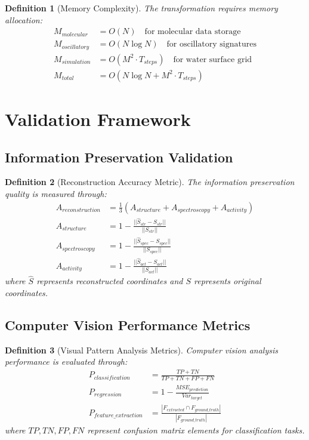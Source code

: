 \documentclass[12pt,a4paper]{article}
\newtheorem{definition}{Definition}
\begin{document}
\begin{definition}[Memory Complexity]
The transformation requires memory allocation:
\begin{align}
M_{molecular} &= O(N) \quad \text{for molecular data storage} \\
M_{oscillatory} &= O(N \log N) \quad \text{for oscillatory signatures} \\
M_{simulation} &= O(M^2 \cdot T_{steps}) \quad \text{for water surface grid} \\
M_{total} &= O(N \log N + M^2 \cdot T_{steps})
\end{align}
\end{definition}

\section{Validation Framework}

\subsection{Information Preservation Validation}

\begin{definition}[Reconstruction Accuracy Metric]
The information preservation quality is measured through:
\begin{align}
A_{reconstruction} &= \frac{1}{3} \left( A_{structure} + A_{spectroscopy} + A_{activity} \right) \\
A_{structure} &= 1 - \frac{||\hat{S}_{str} - S_{str}||}{||S_{str}||} \\
A_{spectroscopy} &= 1 - \frac{||\hat{S}_{spec} - S_{spec}||}{||S_{spec}||} \\
A_{activity} &= 1 - \frac{||\hat{S}_{act} - S_{act}||}{||S_{act}||}
\end{align}
where $\hat{S}$ represents reconstructed coordinates and $S$ represents original coordinates.
\end{definition}

\subsection{Computer Vision Performance Metrics}

\begin{definition}[Visual Pattern Analysis Metrics]
Computer vision analysis performance is evaluated through:
\begin{align}
P_{classification} &= \frac{TP + TN}{TP + TN + FP + FN} \\
P_{regression} &= 1 - \frac{MSE_{prediction}}{Var_{target}} \\
P_{feature\_extraction} &= \frac{|F_{extracted} \cap F_{ground\_truth}|}{|F_{ground\_truth}|}
\end{align}
where $TP, TN, FP, FN$ represent confusion matrix elements for classification tasks.
\end{definition}
\end{document}
